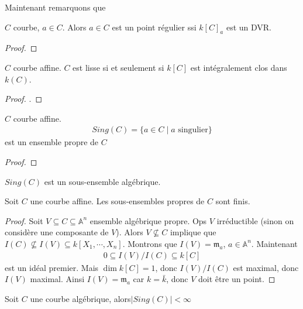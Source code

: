         Maintenant remarquons que
        \begin{theo}
            $C$ courbe, $a \in C$. Alors $a \in C$ est un point régulier ssi $k[C]_a$ est un DVR.
        \end{theo}
        \begin{proof}
        \end{proof}
        \begin{theo}
            $C$ courbe affine. $C$ est lisse si et seulement si $k[C]$ est intégralement clos dans $k(C)$.
        \end{theo}
        \begin{proof}
            .
        \end{proof}
        \begin{theo}
            $C$ courbe affine.
            \begin{align*}
                Sing(C) = \{a \in C \mid a \text{ singulier} \}
            \end{align*}
            est un ensemble propre de $C$
        \end{theo}
        \begin{proof}
        \end{proof}
        \begin{exo}
            $Sing(C)$ est un sous-ensemble algébrique.
        \end{exo}
        \begin{prop}
            \label{prop412}
            Soit $C$ une courbe affine. Les sous-ensembles propres de $C$ sont finis.
        \end{prop}
        \begin{proof}
            Soit $V \subseteq C \subseteq \mathbb{A}^n$ ensemble algébrique propre. Ops $V$ irréductible (sinon on considère une composante de $V$). Alors $V \nsubseteq C$ implique que $I(C) \nsubseteq I(V) \subseteq k[X_1, \cdots, X_n]$. Montrons que $I(V) = \mathfrak{m}_a$, $a \in \mathbb{A}^n$. Maintenant
            \begin{align*}
                0 \subseteq I(V)/I(C) \subseteq k[C]
            \end{align*}
            est un idéal premier. Mais $\dim k[C] = 1$, donc $I(V)/I(C)$ est maximal, donc $I(V)$ maximal. Ainsi $I(V) = \mathfrak{m}_a$ car $k = \bar k$, donc $V$ doit être un point.
        \end{proof}
        \begin{coro}
            Soit $C$ une courbe algébrique, alors$|Sing(C)| < \infty$
        \end{coro}